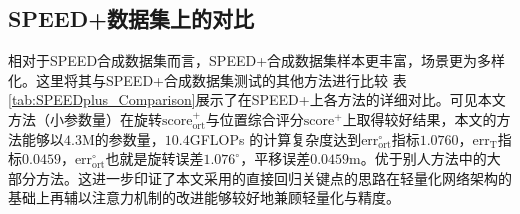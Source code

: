 \subsection{SPEED+数据集上的对比}

相对于SPEED合成数据集而言，SPEED+合成数据集样本更丰富，场景更为多样化。这里将其与SPEED+合成数据集测试的其他方法进行比较
表\ref{tab:SPEEDplus_Comparison}展示了在SPEED+上各方法的详细对比。可见本文方法（小参数量）在旋转$\text{score}_{\text{ort}}^+$与位置综合评分$\text{score}^+$上取得较好结果，本文的方法能够以$4.3$M的参数量，$10.4 $GFLOPs 的计算复杂度达到$\text{err}_{\text{ort}}^{\circ}$指标$1.0760$，$\text{err}_{\text{T}}$指标$0.0459$，$\text{err}_{\text{ort}}^{\circ}$也就是旋转误差$1.076^{\circ}$，平移误差$0.0459$m。优于别人方法中的大部分方法。这进一步印证了本文采用的直接回归关键点的思路在轻量化网络架构的基础上再辅以注意力机制的改进能够较好地兼顾轻量化与精度。


